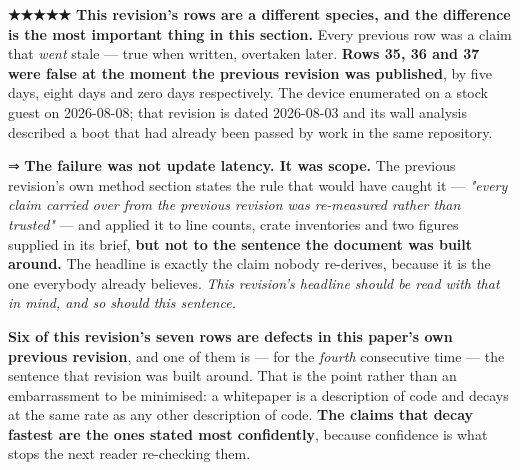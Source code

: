 \documentclass[10.5pt]{article}
\begin{document}
\begin{warnbox}\small
\textbf{★★★★★ This revision's rows are a different species, and the difference is the most
important thing in this section.} Every previous row was a claim that \emph{went} stale — true
when written, overtaken later. \textbf{Rows 35, 36 and 37 were false at the moment the previous
revision was published}, by five days, eight days and zero days respectively. The device
enumerated on a stock guest on 2026-08-08; that revision is dated 2026-08-03 and its wall analysis
described a boot that had already been passed by work in the same repository.

\smallskip
⇒ \textbf{The failure was not update latency. It was scope.} The previous revision's own method
section states the rule that would have caught it — \emph{"every claim carried over from the
previous revision was re-measured rather than trusted"} — and applied it to line counts, crate
inventories and two figures supplied in its brief, \textbf{but not to the sentence the document
was built around.} The headline is exactly the claim nobody re-derives, because it is the one
everybody already believes. \emph{This revision's headline should be read with that in mind, and
so should this sentence.}
\end{warnbox}

\textbf{Six of this revision's seven rows are defects in this paper's own previous revision}, and
one of them is — for the \emph{fourth} consecutive time — the sentence that revision was built
around. That is the point rather than an embarrassment to be minimised: a whitepaper is a
description of code and decays at the same rate as any other description of code. \textbf{The
claims that decay fastest are the ones stated most confidently}, because confidence is what stops
the next reader re-checking them.
\end{document}
